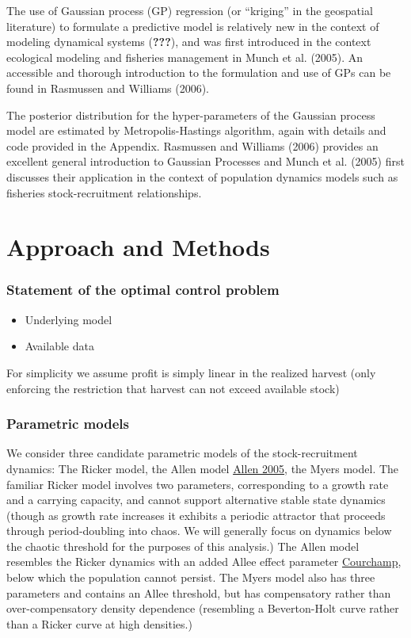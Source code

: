 \documentclass[author-year, review]{elsarticle} %
\begin{document}
The use of Gaussian process (GP) regression (or ``kriging'' in the
geospatial literature) to formulate a predictive model is relatively new
in the context of modeling dynamical systems ({\textbf{???}}), and was
first introduced in the context ecological modeling and fisheries
management in Munch et al. (2005). An accessible and thorough
introduction to the formulation and use of GPs can be found in Rasmussen
and Williams (2006).

The posterior distribution for the hyper-parameters of the Gaussian
process model are estimated by Metropolis-Hastings algorithm, again with
details and code provided in the Appendix. Rasmussen and Williams (2006)
provides an excellent general introduction to Gaussian Processes and
Munch et al. (2005) first discusses their application in the context of
population dynamics models such as fisheries stock-recruitment
relationships.

\section{Approach and Methods}\label{approach-and-methods}

\subsubsection{Statement of the optimal control
problem}\label{statement-of-the-optimal-control-problem}

\begin{itemize}
\itemsep1pt\parskip0pt
\item
  Underlying model
\item
  Available data
\end{itemize}

For simplicity we assume profit is simply linear in the realized harvest
(only enforcing the restriction that harvest can not exceed available
stock)

\subsubsection{Parametric models}\label{parametric-models}

We consider three candidate parametric models of the stock-recruitment
dynamics: The Ricker model, the Allen model \href{}{Allen 2005}, the
Myers model. The familiar Ricker model involves two parameters,
corresponding to a growth rate and a carrying capacity, and cannot
support alternative stable state dynamics (though as growth rate
increases it exhibits a periodic attractor that proceeds through
period-doubling into chaos. We will generally focus on dynamics below
the chaotic threshold for the purposes of this analysis.) The Allen
model resembles the Ricker dynamics with an added Allee effect parameter
\href{}{Courchamp}, below which the population cannot persist. The Myers
model also has three parameters and contains an Allee threshold, but has
compensatory rather than over-compensatory density dependence
(resembling a Beverton-Holt curve rather than a Ricker curve at high
densities.)
\end{document}
